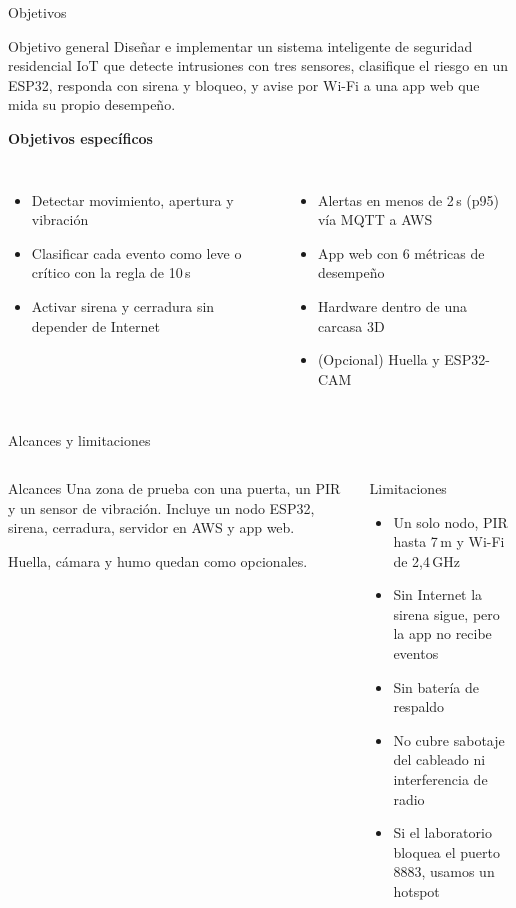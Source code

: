 \documentclass[aspectratio=169,10pt]{beamer}
\begin{document}
\begin{frame}{Objetivos}
  \begin{block}{Objetivo general}
    Diseñar e implementar un sistema inteligente de seguridad residencial IoT que detecte intrusiones con tres sensores, clasifique el riesgo en un ESP32, responda con sirena y bloqueo, y avise por Wi-Fi a una app web que mida su propio desempeño.
  \end{block}
  \textbf{Objetivos específicos}
  \begin{columns}[T]
    \begin{itemize}
      \item Detectar movimiento, apertura y vibración
      \item Clasificar cada evento como leve o crítico con la regla de 10\,s
      \item Activar sirena y cerradura sin depender de Internet
    \end{itemize}
    \begin{itemize}
      \item Alertas en menos de 2\,s (p95) vía MQTT a AWS
      \item App web con 6 métricas de desempeño
      \item Hardware dentro de una carcasa 3D
      \item (Opcional) Huella y ESP32-CAM
    \end{itemize}
  \end{columns}
\end{frame}

\begin{frame}{Alcances y limitaciones}
  \begin{columns}[T]
    \begin{block}{Alcances}
      \small
      Una zona de prueba con una puerta, un PIR y un sensor de vibración. Incluye un nodo ESP32, sirena, cerradura, servidor en AWS y app web.\par\vspace{2mm}
      Huella, cámara y humo quedan como opcionales.
    \end{block}
    \begin{alertblock}{Limitaciones}
      \small
      \begin{itemize}
        \item Un solo nodo, PIR hasta 7\,m y Wi-Fi de 2,4\,GHz
        \item Sin Internet la sirena sigue, pero la app no recibe eventos
        \item Sin batería de respaldo
        \item No cubre sabotaje del cableado ni interferencia de radio
        \item Si el laboratorio bloquea el puerto 8883, usamos un hotspot
      \end{itemize}
    \end{alertblock}
  \end{columns}
\end{frame}
\end{document}
